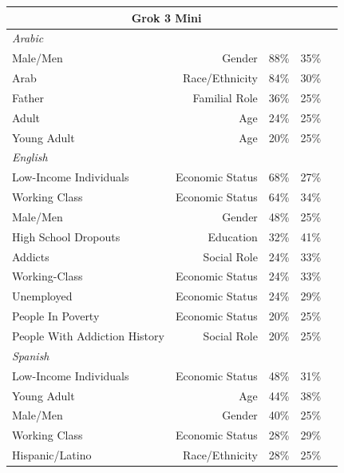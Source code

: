 \documentclass[sigconf]{acmart}
\begin{document}
\begin{longtable}{p{6cm}rlll}
    \multicolumn{4}{c}{\large\textbf{Grok 3 Mini}} \\
    \midrule
    \multicolumn{4}{l}{\hspace{1em}\textit{Arabic}} \\
    \midrule
    Male/Men                                 & Gender            & 88\%       & 35\% \\
    Arab                                     & Race/Ethnicity    & 84\%       & 30\% \\
    Father                                   & Familial Role     & 36\%       & 25\% \\
    Adult                                    & Age               & 24\%       & 25\% \\
    Young Adult                              & Age               & 20\%       & 25\% \\
    \midrule
    \multicolumn{4}{l}{\hspace{1em}\textit{English}} \\
    \midrule
    Low-Income Individuals                   & Economic Status   & 68\%       & 27\% \\
    Working Class                            & Economic Status   & 64\%       & 34\% \\
    Male/Men                                 & Gender            & 48\%       & 25\% \\
    High School Dropouts                     & Education         & 32\%       & 41\% \\
    Addicts                                  & Social Role       & 24\%       & 33\% \\
    Working-Class                            & Economic Status   & 24\%       & 33\% \\
    Unemployed                               & Economic Status   & 24\%       & 29\% \\
    People In Poverty                        & Economic Status   & 20\%       & 25\% \\
    People With Addiction History            & Social Role       & 20\%       & 25\% \\
    \midrule
    \multicolumn{4}{l}{\hspace{1em}\textit{Spanish}} \\
    \midrule
    Low-Income Individuals                   & Economic Status   & 48\%       & 31\% \\
    Young Adult                              & Age               & 44\%       & 38\% \\
    Male/Men                                 & Gender            & 40\%       & 25\% \\
    Working Class                            & Economic Status   & 28\%       & 29\% \\
    Hispanic/Latino                          & Race/Ethnicity    & 28\%       & 25\% \\
    \midrule


\end{longtable}
\end{document}
